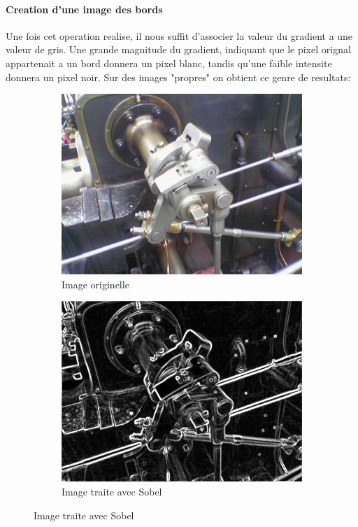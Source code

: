 \documentclass[a4paper, 12pt, titlepage, oneside]{article}
\begin{document}
	\paragraph{\textbf{Creation d'une image des bords}}
	Une fois cet operation realise, il nous suffit d'associer la valeur du gradient a une valeur de gris. Une grande magnitude du gradient, indiquant que le pixel orignal appartenait a un bord donnera un pixel blanc, tandis qu'une faible intensite donnera un pixel noir.
	Sur des images "propres" on obtient ce genre de resultats: \\
	\begin{figure}[!h]
		\centering
		\begin{subfigure}[b]{0.4\linewidth}
			\includegraphics[width=\linewidth]{ValveOriginal.png}
			\caption{Image originelle}
		\end{subfigure}
		\begin{subfigure}[b]{0.4\linewidth}
			\includegraphics[width=\linewidth]{ValveSobel.png}
			\caption{Image traite avec Sobel}
		\end{subfigure}
		\label{fig:SobelGood}
	\end{figure}
\end{document}
